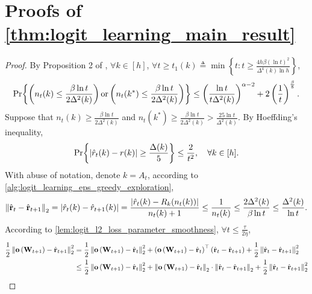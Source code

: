 \section{Proofs of \cref{thm:logit_learning_main_result} }
\begin{proof}
	By Proposition 2 of \citep{seldin2017improved},
	$\forall k \in [h]$, $\forall t \ge t_1(k) \triangleq \min{\left\{ t : t \ge \frac{4 h \beta \left(\ln{t}\right)^2}{\Delta^4(k) \ln{h}} \right\}}$,
	\begin{equation*}
	\begin{split}
	{\text{Pr}}{\left\{ \left( n_t(k) \le \frac{\beta \ln{t}}{2 \Delta^2(k)} \right) \text{or} \left( n_t(k^*) \le \frac{\beta \ln{t}}{2 \Delta^2(k)} \right) \right\}} \le \left( \frac{\ln{t}}{t \Delta^2(k)} \right)^{\alpha - 2} + 2 \left(\frac{1}{t}\right)^{\frac{\beta}{8}}.
	\end{split}
	\end{equation*}
	Suppose that $n_t(k) \ge \frac{\beta \ln{t}}{2 \Delta^2(k)}$ and $n_t(k^*) \ge \frac{\beta \ln{t}}{2 \Delta^2(k)} > \frac{25 \ln{t}}{\Delta^2(k)}$. By Hoeffding's inequality,
	\begin{equation*}
	    {\text{Pr}}{\left\{ \left| \hat{r}_t(k) - r(k) \right| \ge \frac{\Delta(k)}{5} \right\}} \le \frac{2}{t^2}, \quad \forall k \in [h].
	\end{equation*}
	With abuse of notation, denote $k = A_t$, according to \cref{alg:logit_learning_eps_greedy_exploration},
	\begin{equation*}
	\begin{split}
	    \left\| \hat{{\mathbf{r}}}_t - \hat{{\mathbf{r}}}_{t+1} \right\|_2 = \left| \hat{r}_t(k) - \hat{r}_{t+1}(k) \right| = \frac{\left| \hat{r}_t(k) - R_k(n_t(k)) \right|}{n_t(k) + 1} \le \frac{1}{n_t(k)} \le \frac{2 \Delta^2(k)}{\beta \ln{t}} \le \frac{\Delta^2(k)}{\ln{t}}.
	\end{split}
	\end{equation*}
	According to \cref{lem:logit_l2_loss_parameter_smoothness}, $\forall t \le \frac{\tau}{2 \eta}$,
	\begin{equation*}
	\begin{split}
	\frac{1}{2} \left\| \rvo\left( \rmW_{t+1} \right) - \hat{\rvr}_{t+1}\right\|_2^2 &= \frac{1}{2} \left\| \rvo\left( \rmW_{t+1} \right) - \hat{\rvr}_t\right\|_2^2 + \left( \rvo\left( \rmW_{t+1} \right) - \hat{\rvr}_t \right)^\top \left( \hat{\rvr}_t - \hat{\rvr}_{t+1} \right) + \frac{1}{2} \left\| \hat{\rvr}_t - \hat{\rvr}_{t+1} \right\|_2^2 \\
	&\le \frac{1}{2} \left\| \rvo\left( \rmW_{t+1} \right) - \hat{\rvr}_t\right\|_2^2 + \left\| \rvo\left( \rmW_{t+1} \right) - \hat{\rvr}_t \right\|_2 \cdot \left\| \hat{\rvr}_t - \hat{\rvr}_{t+1} \right\|_2 + \frac{1}{2} \left\| \hat{\rvr}_t - \hat{\rvr}_{t+1} \right\|_2^2 \\

\end{split}
\end{equation*}
\end{proof}
